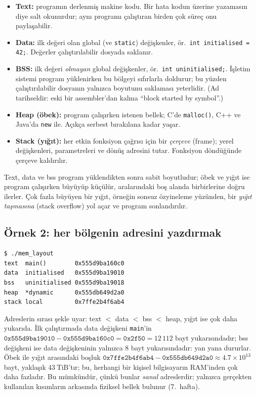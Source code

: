 \documentclass[11pt,a4paper]{article}
\newcommand{\cmd}[1]{\texttt{#1}}
\begin{document}
\begin{itemize}
  \item \textbf{Text:} programın derlenmiş makine kodu. Bir hata kodun üzerine yazamasın diye salt okunurdur; aynı programı çalıştıran birden çok süreç onu paylaşabilir.
  \item \textbf{Data:} ilk değeri olan global (ve \texttt{static}) değişkenler, ör.\ \texttt{int initialised = 42;}. Değerler çalıştırılabilir dosyada saklanır.
  \item \textbf{BSS:} ilk değeri \emph{olmayan} global değişkenler, ör.\ \texttt{int uninitialised;}. İşletim sistemi program yüklenirken bu bölgeyi sıfırlarla doldurur; bu yüzden çalıştırılabilir dosyanın yalnızca boyutunu saklaması yeterlidir. (Ad tarihseldir: eski bir assembler'dan kalma ``block started by symbol''.)
  \item \textbf{Heap (öbek):} program çalışırken istenen bellek; C'de \cmd{malloc()}, C++ ve Java'da \texttt{new} ile. Açıkça serbest bırakılana kadar yaşar.
  \item \textbf{Stack (yığıt):} her etkin fonksiyon çağrısı için bir \emph{çerçeve} (frame); yerel değişkenleri, parametreleri ve dönüş adresini tutar. Fonksiyon döndüğünde çerçeve kaldırılır.
\end{itemize}

Text, data ve bss program yüklendikten sonra sabit boyutludur; öbek ve yığıt ise program çalışırken büyüyüp küçülür, aralarındaki boş alanda birbirlerine doğru ilerler. Çok fazla büyüyen bir yığıt, örneğin sonsuz özyineleme yüzünden, bir \emph{yığıt taşmasına} (stack overflow) yol açar ve program sonlandırılır.

\subsection{Örnek 2: her bölgenin adresini yazdırmak}



\begin{lstlisting}[style=term]
$ ./mem_layout
text  main()        0x555d9ba160c0
data  initialised   0x555d9ba19010
bss   uninitialised 0x555d9ba19018
heap  *dynamic      0x555db649d2a0
stack local         0x7ffe2b4f6ab4
\end{lstlisting}

Adreslerin sırası şekle uyar: text $<$ data $<$ bss $<$ heap, yığıt ise çok daha yukarıda. İlk çalıştırmada data değişkeni \texttt{main}'in $\texttt{0x555d9ba19010} - \texttt{0x555d9ba160c0} = \texttt{0x2f50} = 12\,112$ bayt yukarısındadır; bss değişkeni ise data değişkeninin yalnızca $8$ bayt yukarısındadır: yan yana dururlar. Öbek ile yığıt arasındaki boşluk $\texttt{0x7ffe2b4f6ab4} - \texttt{0x555db649d2a0} \approx 4.7\times10^{13}$ bayt, yaklaşık $43\ \text{TiB}$'tır; bu, herhangi bir kişisel bilgisayarın RAM'inden çok daha fazladır. Bu mümkündür, çünkü bunlar \emph{sanal} adreslerdir; yalnızca gerçekten kullanılan kısımların arkasında fiziksel bellek bulunur (7.~hafta).
\end{document}
